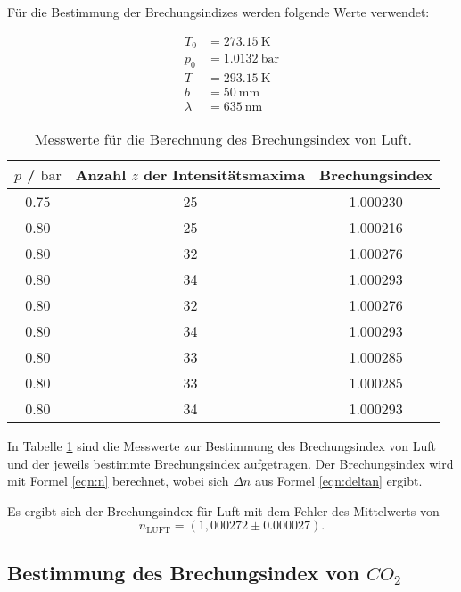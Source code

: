 Für die Bestimmung der Brechungsindizes werden folgende Werte verwendet:

\begin{align}
	T_0 &= \SI{273,15}{\kelvin} \\
	p_0 &= \SI{1,0132}{\bar}  \\
	T &= \SI{293,15}{\kelvin} \\
	b &= \SI{50}{\milli\meter} \\
	\lambda &= \SI{635}{\nano\meter}
\end{align}



\begin{table}
	\caption{Messwerte für die Berechnung des Brechungsindex von Luft.}
	\label{tab:luftbrech}
	\centering
	\begin{tabular}{ccc}
	\toprule
	$p$ / $\si{\bar}$ & Anzahl $z$ der Intensitätsmaxima & Brechungsindex \\
	\midrule
		0.75 & 25 & 1.000230 \\
		0.80 & 25 & 1.000216 \\
		0.80 & 32 & 1.000276 \\
		0.80 & 34 & 1.000293 \\
		0.80 & 32 & 1.000276 \\
		0.80 & 34 & 1.000293 \\
		0.80 & 33 & 1.000285 \\
		0.80 & 33 & 1.000285 \\
		0.80 & 34 & 1.000293 \\
	\bottomrule
	\end{tabular}
\end{table}

In Tabelle \ref{tab:luftbrech} sind die Messwerte zur Bestimmung des Brechungsindex von Luft
und der jeweils bestimmte Brechungsindex aufgetragen.
Der Brechungsindex wird mit Formel \eqref{eqn:n} berechnet, wobei sich $\Delta n$ aus Formel
\eqref{eqn:deltan} ergibt.

Es ergibt sich der Brechungsindex für Luft mit dem Fehler des Mittelwerts von
\begin{equation}
	n_{\mathrm{LUFT}} = (1,000272 \pm 0.000027) \mathrm{.}
\end{equation}


\subsection{Bestimmung des Brechungsindex von \texorpdfstring{$CO_2$}{math} }

